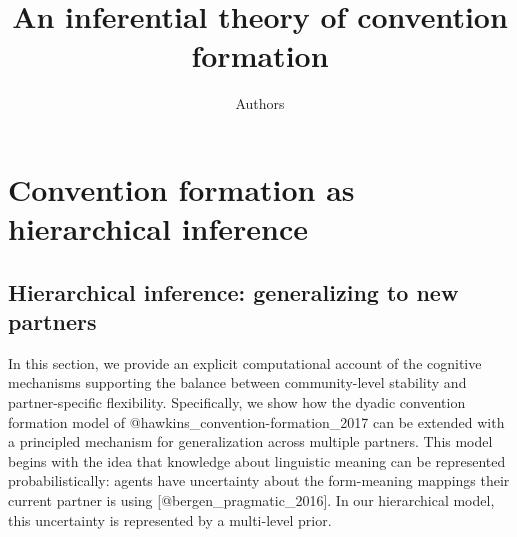 \documentclass[11pt, floatsintext]{apa6}
\title{An inferential theory of convention formation}
\author{Authors}
\affiliation{Universities}
\begin{document}
\maketitle

%
%
%
%
%
\section{Convention formation as hierarchical inference}

%
%
\subsection{Hierarchical inference: generalizing to new partners}

In this section, we provide an explicit computational account of the cognitive mechanisms supporting the balance between community-level stability and partner-specific flexibility.
Specifically, we show how the dyadic convention formation model of @hawkins_convention-formation_2017 can be extended with a principled mechanism for generalization across multiple partners.
This model begins with the idea that knowledge about linguistic meaning can be represented probabilistically: agents have uncertainty about the form-meaning mappings their current partner is using [@bergen_pragmatic_2016]. 
In our hierarchical model, this uncertainty is represented by a multi-level prior. 
\end{document}
